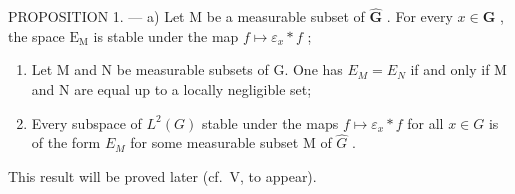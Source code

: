PROPOSITION 1. --- a) Let M be a measurable subset of \(\widehat{\mathbf{G}}\) . For every \(x \in \mathbf{G}\) , the space \(\mathrm{E}_{\mathrm{M}}\) is stable under the map \(f \mapsto \varepsilon_x * f\) ;

\begin{enumerate}
\def\labelenumi{\alph{enumi})}
\setcounter{enumi}{1}
\item
  Let M and N be measurable subsets of G. One has \(E_{M} = E_{N}\) if and only if M and N are equal up to a locally negligible set;
\item
  Every subspace of \(L^{2}(G)\) stable under the maps \(f \mapsto \varepsilon_{x} * f\) for all \(x \in G\) is of the form \(E_{M}\) for some measurable subset M of \(\widehat{G}\) .
\end{enumerate}

This result will be proved later (cf.~V, to appear).
